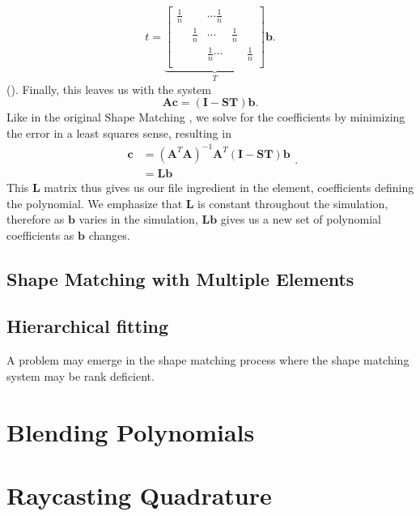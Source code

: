 \begin{equation}
t = 
\underbrace{
\left[\begin{array}{ccccccc}
\frac{1}{n} & & \cdots \frac{1}{n} & & \\
& \frac{1}{n} & \cdots & \frac{1}{n} & \\
& & \frac{1}{n} \cdots & & \frac{1}{n} \\
\end{array} \right]}_{T} 
\mathbf{b}
\text{.}
\end{equation} (). Finally, this leaves us with the system
\begin{equation}
\mathbf{A}\mathbf{c}=(\mathbf{I}-\mathbf{ST})\mathbf{b}
\text{.}
\end{equation}
Like in the original Shape Matching \cite{10.1145/1073204.1073216}, we solve for the coefficients by minimizing the error in a least squares sense, resulting in
\begin{equation}
\begin{split}
\mathbf{c} & = (\mathbf{A}^T\mathbf{A})^{-1}\mathbf{A}^T(\mathbf{I-ST})\mathbf{b} \\
           & = \mathbf{L}\mathbf{b}
\end{split}
\text{.}
\end{equation}
This $\mathbf{L}$ matrix thus gives us our file ingredient in the element, coefficients defining the polynomial. We emphasize that $\mathbf{L}$ is constant throughout the simulation, therefore as $\mathbf{b}$ varies in the simulation, $\mathbf{Lb}$ gives us a new set of polynomial coefficients as $\mathbf{b}$ changes. 

\subsection{Shape Matching with Multiple Elements}
\subsection{Hierarchical fitting}
A problem may emerge in the shape matching process where the shape matching system may be rank deficient.

\section{Blending Polynomials}
\section{Raycasting Quadrature}
